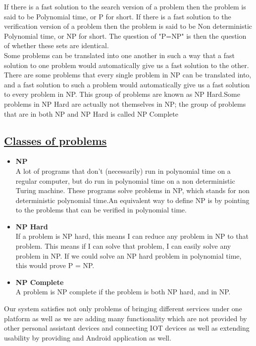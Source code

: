 \noindent
If there is a fast solution to the search version of a problem then the problem is
said to be Polynomial time, or P for short. If there is a fast solution to the verification version of a problem then the problem is said to be Non deterministic Polynomial time,
or NP for short. The question of "P=NP" is then the question of whether these sets are identical.\\

\noindent
Some problems can be translated into one another in such a way that a fast
solution to one problem would automatically give us a fast solution to the
other. There are some problems that every single problem in NP can be
translated into, and a fast solution to such a problem would automatically give
us a fast solution to every problem in NP. This group of problems are known as
NP Hard.Some problems in NP Hard
are actually not themselves in NP; the
group of problems that are in both NP and NP Hard
is called NP Complete

\subsection*{\underline{Classes of problems}}
\begin{itemize}
\item \textbf{NP}\\
A lot of programs that don't (necessarily) run in polynomial time
on a regular computer, but do run in polynomial time on a non deterministic
Turing machine. These programs solve problems in NP, which stands for
non deterministic polynomial time.An equivalent way to define NP is by pointing to the problems that can be
verified in polynomial time.

\item \textbf{NP Hard}\\
If a problem is NP hard,
this means I can reduce any problem in NP to that problem. This means if I can solve that problem, I can easily solve any problem in NP. If we could solve an NP hard
problem in polynomial time, this would
prove P = NP.

\item \textbf{NP Complete}\\
A problem is NP complete
if the problem is both
NP hard, and in NP.
\end{itemize}

\noindent
\hspace{3em}Our system satisfies not only problems of bringing different services under one platform as well as we are adding many functionality which are not provided by other personal assistant devices and connecting IOT devices as well as extending usability by providing and Android application as well.\\

